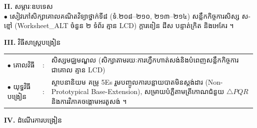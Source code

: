 \documentclass[a4paper,10pt]{article}
\newcommand{\en}[1]{{\TimesEn #1}}
\newcommand{\tri}[1]{\ensuremath{\triangle #1}}
\begin{document}
{%
\textbf{II.} {\muol សម្ភារៈឧបទេស}\\[1pt]
\hspace*{0.55cm}$\bullet$ \hspace{0.35cm} សៀវភៅសិក្សាគោលគណិតវិទ្យាថ្នាក់ទី៨ (ទំ.២០៨--២១០, ២១៣--២១៤) សន្លឹកកិច្ចការសិស្ស ស-ខ្មៅ (\en{Worksheet\_ALT} ចំនួន ២ ទំព័រ គ្មាន \en{LCD}) ក្ដារខៀន ដីស បន្ទាត់ក្រិត និងអេគែរ ។

\vspace{2pt}

\textbf{III.} {\muol វិធីសាស្រ្តបង្រៀន}\\[1pt]
\hspace*{0.45cm}%
\begin{tabular}{@{}l l L{14.85cm}@{}}
  $\bullet$ \hspace{0.25cm} គោលវិធី & : & សិស្សមជ្ឈមណ្ឌល (សិក្សាតាមរយៈការហ្វឹកហាត់សង់និងបំពេញសន្លឹកកិច្ចការជាគោល គ្មាន \en{LCD}) \\
  $\bullet$ \hspace{0.25cm} យុទ្ធវិធីបង្រៀន & : & ស្ថាបនានិយម គម្រូ \en{5Es} រួមបញ្ចូលការបន្លាយបាតមិនស្តង់ដារ (\en{Non-Prototypical Base-Extension}), សម្រាយបំភ្លឺតាមត្រីកោណជំនួយ $\tri{PQR}$ និងការវិភាគចង្កោមអរតូសង់ ។ \\
\end{tabular}
}

\vspace{2pt}

\textbf{IV.} {\muol ដំណើរការបង្រៀន}

\vspace{1pt}
\end{document}
